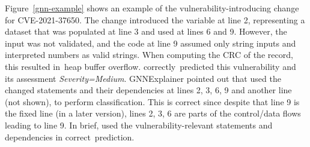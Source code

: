 





\vspace{3pt}
 Figure~\ref{gnn-example} shows an example of
the vulnerability-introduc\-ing change for CVE-2021-37650. The change
introduced the variable  at line 2,
representing a dataset that was populated at line 3 and used at lines
6 and 9. However, the input was not validated, and the code at line 9
assumed only string inputs and interpreted numbers as valid strings.
When computing the CRC of the record, this resulted in~heap buffer
overflow. {\tool} correctly~predicted this vulnerability and its
assessment {\em Severity=Medium}. GNNExplainer pointed out that
{\tool} used the changed statements and their dependencies at lines 2,
3, 6, 9 and another line (not shown), to perform classification. This
is correct since despite that line 9 is the fixed line (in a later
version), lines 2, 3, 6 are parts of the control/data flows leading to
line 9. In brief, {\tool} used the vulnerability-relevant statements
and dependencies in correct~prediction.







	
	
